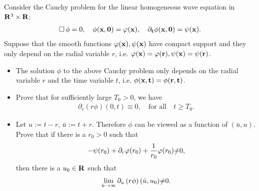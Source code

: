 \documentclass[12pt]{article}
\begin{document}
Consider the Cauchy problem for the linear homogeneous wave equation in ${\bf R}^{3}\times {\bf R}$:
\begin{align*}
	\Box\,\phi=0,\quad \phi(\bf x, 0)=\varphi(\bf x),\quad \partial_{t}\phi(\bf x,0)=\psi(\bf x).
\end{align*}
Suppose that the smooth functions $\varphi(\bf x), \psi(\bf x)$ have compact support and they only depend on the radial variable $r$, i.e. $\varphi(\bf x)=\varphi(r),\psi(\bf x)=\psi(r)$.
 \vspace{2mm}
 \begin{itemize}
 	\item The solution $\phi$ to the above Cauchy problem only depends on the radial variable $r$ and the time  variable $t$, i.e. $\phi(\bf x,t)=\phi(r,t)$.
 	\vspace{2mm}
 	
 	\item Prove that for sufficiently large $T_{0}>0$, we have
 	\begin{align*}
 		\partial_{r}\left(r\phi\right)(0,t)\equiv0,\quad \text{for all}\quad t\geq T_{0}.
 	\end{align*}
 \vspace{2mm}
 \item Let $u:=t-r,\, \bar{u}:=t+r$. Therefore $\phi$ can be viewed as a function of $(\bar{u},u)$. Prove that if there is a $r_{0}>0$ such that
 \begin{align*}
 	-\psi(r_{0})+\partial_{r}\varphi(r_{0})+\frac{1}{r_{0}}\varphi(r_{0})\slashed{=}0,
 \end{align*}
then there is a $u_{0}\in{\bf R}$ such that
\begin{align*}
	\lim_{\bar{u}\rightarrow\infty}\partial_{u}\left(r\phi\right)(\bar{u},u_{0})\slashed{=}0.
\end{align*}
 \end{itemize}
\end{document}
